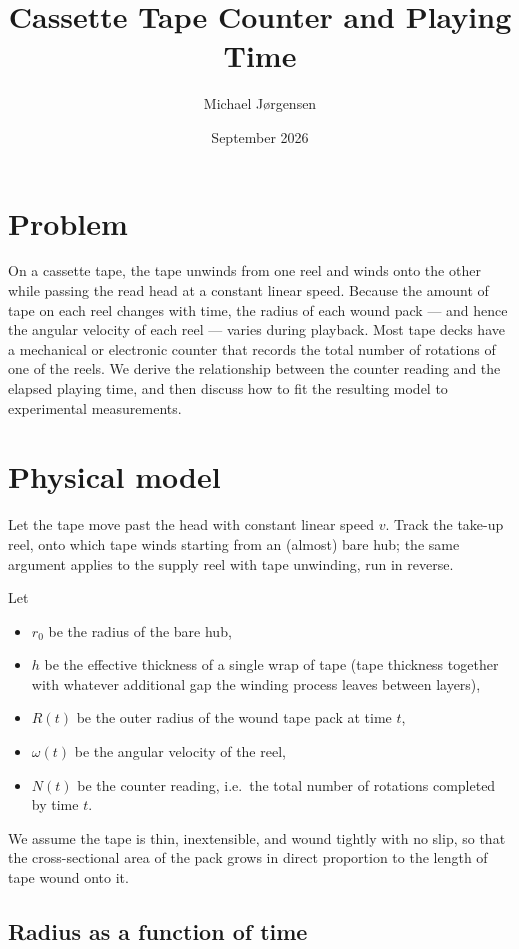 \documentclass[12pt,oneside,a4paper]{article}
\title{Cassette Tape Counter and Playing Time}
\date{September 2026}
\author{Michael Jørgensen}
\begin{document}
\maketitle

\section{Problem}

On a cassette tape, the tape unwinds from one reel and winds onto the
other while passing the read head at a constant linear speed. Because
the amount of tape on each reel changes with time, the radius of each
wound pack --- and hence the angular velocity of each reel --- varies
during playback. Most tape decks have a mechanical or electronic
counter that records the total number of rotations of one of the
reels. We derive the relationship between the counter reading and the
elapsed playing time, and then discuss how to fit the resulting model
to experimental measurements.

\section{Physical model}

Let the tape move past the head with constant linear speed $v$. Track
the take-up reel, onto which tape winds starting from an (almost)
bare hub; the same argument applies to the supply reel with tape
unwinding, run in reverse.

Let
\begin{itemize}
\item $r_0$ be the radius of the bare hub,
\item $h$ be the effective thickness of a single wrap of tape (tape
  thickness together with whatever additional gap the winding
  process leaves between layers),
\item $R(t)$ be the outer radius of the wound tape pack at time $t$,
\item $\omega(t)$ be the angular velocity of the reel,
\item $N(t)$ be the counter reading, i.e.\ the total number of
  rotations completed by time $t$.
\end{itemize}

We assume the tape is thin, inextensible, and wound tightly with no
slip, so that the cross-sectional area of the pack grows in direct
proportion to the length of tape wound onto it.

\subsection{Radius as a function of time}
\end{document}
